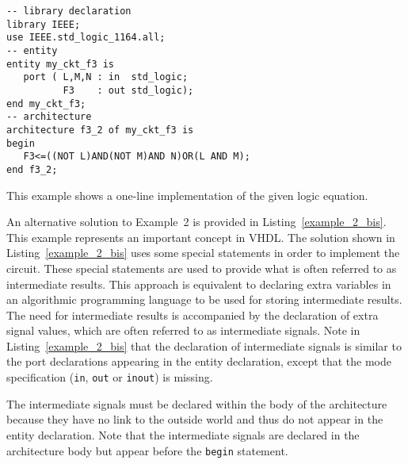 \noindent
\begin{minipage}{0.6\linewidth}
\begin{lstlisting}[label=example_2, caption=Solution of Example~2.]
-- library declaration
library IEEE;
use IEEE.std_logic_1164.all;
-- entity
entity my_ckt_f3 is
   port ( L,M,N : in  std_logic;
          F3    : out std_logic);
end my_ckt_f3;
-- architecture
architecture f3_2 of my_ckt_f3 is
begin
   F3<=((NOT L)AND(NOT M)AND N)OR(L AND M);
end f3_2;
\end{lstlisting}
\end{minipage}
\begin{minipage}{0.4\linewidth}
\begin{flushright}
\end{flushright}
\end{minipage}

This example shows a one-line implementation of the given logic equation.

An alternative solution to Example~2 is provided in Listing~\ref{example_2_bis}. This example represents an important concept in VHDL. The solution shown in Listing~\ref{example_2_bis} uses some special statements in order to implement the circuit. These special statements are used to provide what is often referred to as intermediate results. This approach is equivalent to declaring extra variables in an algorithmic programming language to be used for storing intermediate results. The need for intermediate results is accompanied by the declaration of extra signal values, which are often referred to as intermediate signals. Note in Listing~\ref{example_2_bis} that the declaration of intermediate signals is similar to the port declarations appearing in the entity declaration, except that the mode specification (\texttt{in}, \texttt{out} or \texttt{inout}) is missing.

The intermediate signals must be declared within the body of the architecture because they have no link to the outside world and thus do not appear in the entity declaration. Note that the intermediate signals are declared in the architecture body but appear before the \texttt{begin} statement.

